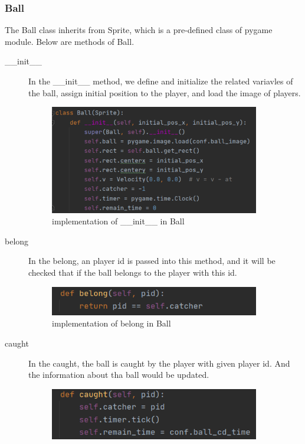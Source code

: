 \documentclass[14pt]{extarticle}
\begin{document}
\subsubsection{Ball}
The Ball class inherits from Sprite, which is a pre-defined class of pygame module. Below are methods of Ball.
\begin{description}
	\item[\_\_init\_\_]
	In the \_\_init\_\_ method, we define and initialize the related variavles of the ball, assign initial position to the player, and load the image of players.
	\begin{figure}[H]
		\begin{center}
			\includegraphics[width=0.9\textwidth]{Ball_init}
			\caption{implementation of \_\_init\_\_ in Ball}
		\end{center}
	\end{figure}
	\item[belong]
	In the belong, an player id is passed into this method, and it will be checked that if the ball belongs to the player with this id. 
	\begin{figure}[H]
		\begin{center}
			\includegraphics[width=0.9\textwidth]{Ball_belong}
			\caption{implementation of belong in Ball}
		\end{center}
	\end{figure}
	\item[caught]
	In the caught, the ball is caught by the player with given player id. And the information about tha ball would be updated.
	\begin{figure}[H]
		\begin{center}
			\includegraphics[width=0.9\textwidth]{Ball_caught}

\end{center}
\end{figure}
\end{description}
\end{document}
